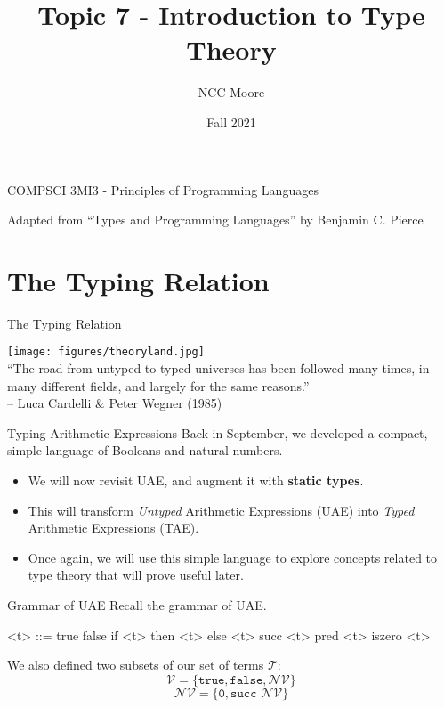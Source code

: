 \documentclass[11pt]{beamer}
\author{NCC Moore}
\title{Topic 7 - Introduction to Type Theory}
\institute{McMaster University}
\date{Fall 2021}
\begin{document}
\begin{frame}
\center
COMPSCI 3MI3 - Principles of Programming Languages
\titlepage

Adapted from ``Types and Programming Languages'' by Benjamin C. Pierce 
\end{frame}

\begin{frame}
\tableofcontents
\end{frame}

\section[Typing]{The Typing Relation}
\begin{frame}[fragile=singleslide]{The Typing Relation}
\begin{center}
\texttt{[image: figures/theoryland.jpg]} \\
``The road from untyped to typed universes has been followed many times, in many different fields, and largely for the same reasons.'' \\
-- Luca Cardelli \& Peter Wegner (1985)
\end{center}
\end{frame}

\begin{frame}[fragile=singleslide]{Typing Arithmetic Expressions}
Back in September, we developed a compact, simple language of Booleans and natural numbers.  
\begin{itemize}
\item We will now revisit UAE, and augment it with \textbf{static types}.
\item This will transform \emph{Untyped} Arithmetic Expressions (UAE) into \emph{Typed} Arithmetic Expressions (TAE).
\item Once again, we will use this simple language to explore concepts related to type theory that will prove useful later.  
\end{itemize}

\end{frame}

\begin{frame}[fragile=singleslide]{Grammar of UAE}
Recall the grammar of UAE.
\begin{grammar}
<t> ::= true 
\alt false
\alt if <t> then <t> else <t>
\alt succ <t>
\alt pred <t>
\alt iszero <t>
\end{grammar}
We also defined two subsets of our set of terms $\mathcal{T}$:
\begin{equation}
\mathcal{V} = \{\texttt{true}, \texttt{false}, \mathcal{NV}\}
\end{equation}
\begin{equation}
\mathcal{NV} = \{\texttt{0}, \texttt{succ }\mathcal{NV}\}
\end{equation}

\end{frame}
\end{document}
